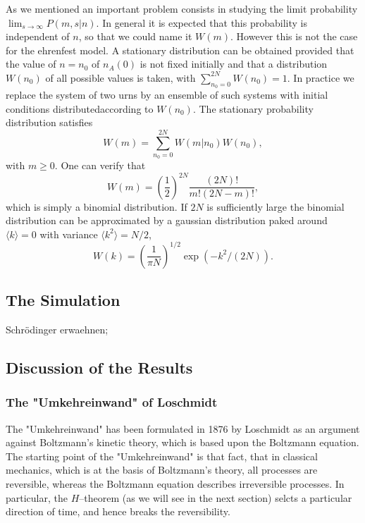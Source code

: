 As we mentioned an important problem consists in studying the limit
probability $\lim_{s \rightarrow \infty} P(m,s|n)$. In general it is expected
that this probability is independent of $n$, so that we could name it $W(m)$.
However this is not the case for the ehrenfest model. A stationary
distribution can be obtained provided that the value of $n=n_0$ of $n_A(0)$ is
not fixed initially and that a distribution $W(n_0)$ of all possible values is
taken, with $\sum_{n_0=0}^{2N} W(n_0) = 1$. In practice we replace the system
of two urns by an ensemble of such systems with initial conditions
distributedaccording to $W(n_0)$. The stationary probability distribution 
satisfies
\begin{displaymath}
  W(m) = \sum_{n_0 = 0}^{2N} W(m|n_0) W(n_0),
\end{displaymath}
with $m \ge 0$. One can verify that
\begin{displaymath}
  W(m) = \left( \frac{1}{2} \right)^{2N} \frac{(2N)!}{m! (2N -m)!},
\end{displaymath}
which is simply a binomial distribution. If $2N$ is sufficiently large the
binomial distribution can be approximated by a gaussian distribution paked
around $\langle k \rangle =0$ with variance $\langle k^2 \rangle = N/2$,
\begin{displaymath}
  W(k) = \left( \frac{1}{\pi N} \right)^{1/2} \exp(-k^2/(2N)). 
\end{displaymath}


\subsection{The Simulation}
Schr\"odinger erwaehnen;
\subsection{Discussion of the Results}
\subsubsection{The "Umkehreinwand" of Loschmidt}
The "Umkehreinwand" has been formulated in 1876 by Loschmidt as an argument
against Boltzmann's kinetic theory, which is based upon the Boltzmann
equation. The starting point of the "Umkehreinwand" is that fact, that
in classical mechanics, which is at the basis of Boltzmann's theory, all
processes are reversible, whereas the Boltzmann equation describes
irreversible processes. In particular, the $H$--theorem (as we will see in the
next section) selcts a particular direction of time, and hence breaks the
reversibility.

